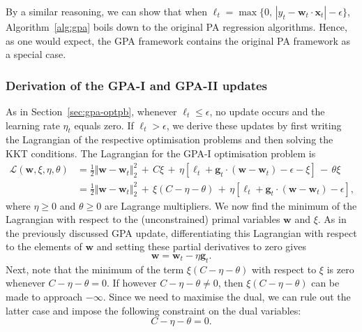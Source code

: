 By a similar reasoning, we can show that when $\ell_t = \max\{0,\, |y_t - \mathbf{w}_t\cdot\mathbf{x}_t| - \epsilon\}$, Algorithm~\ref{alg:gpa} boils down to the original PA regression algorithms. Hence, as one would expect, the GPA framework contains the original PA framework as a special case.

\subsubsection{Derivation of the GPA-I and GPA-II updates}

As in Section~\ref{sec:gpa-optpb}, whenever $\ell_t \leq \epsilon$, no update occurs and the learning rate $\eta_t$ equals zero. If $\ell_t > \epsilon$, we derive these updates by first writing the Lagrangian of the respective optimisation problems and then solving the KKT conditions. The Lagrangian for the GPA-I optimisation problem is
\begin{equation}
\label{eq:gpaI-lagrangian}
\begin{split}
	\mathcal{L}(\mathbf{w}, \xi, \eta, \theta)
	&= \frac{1}{2}\Vert\mathbf{w} - \mathbf{w}_t\Vert_2^2 \, + \, C\xi \, + \, \eta[\ell_t + \mathbf{g}_t\cdot(\mathbf{w} - \mathbf{w}_t) - \epsilon - \xi] \, - \, \theta\xi
	\\	
	&= \frac{1}{2}\Vert\mathbf{w} - \mathbf{w}_t\Vert_2^2 \, + \, \xi(C - \eta - \theta) \, + \, \eta[\ell_t + \mathbf{g}_t\cdot(\mathbf{w} - \mathbf{w}_t) - \epsilon],
\end{split}
\end{equation}
where $\eta \geq 0$ and $\theta \geq 0$ are Lagrange multipliers. We now find the minimum of the Lagrangian with respect to the (unconstrained) primal variables $\mathbf{w}$ and $\xi$. As in the previously discussed GPA update, differentiating this Lagrangian with respect to the elements of $\mathbf{w}$ and setting these partial derivatives to zero gives
\begin{equation}
\label{eq:gpaI-update}
	\mathbf{w} = \mathbf{w}_t - \eta\mathbf{g}_t.
\end{equation}
Next, note that the minimum of the term $\xi(C - \eta - \theta)$ with respect to $\xi$ is zero whenever $C - \eta - \theta = 0$. If however $C - \eta - \theta \neq 0$, then $\xi(C - \eta - \theta)$ can be made to approach $-\infty$. Since we need to maximise the dual, we can rule out the latter case and impose the following constraint on the dual variables:
\begin{equation}
\label{eq:gpaI-dual-variables-constraint}
	C - \eta - \theta = 0.
\end{equation}

